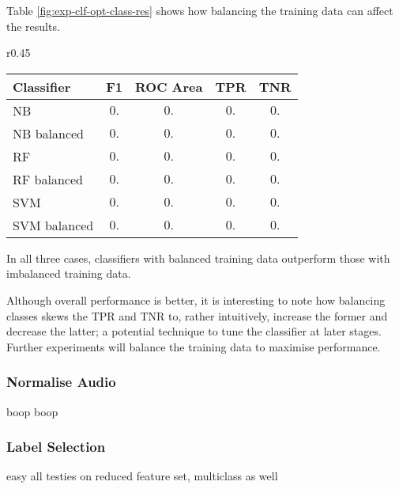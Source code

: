             Table \ref{fig:exp-clf-opt-class-res} shows how balancing the training data can affect the results.
            \begin{wraptable}{r}{0.45\textwidth}
                \scriptsize
                \singlespacing
                \centering
                    \begin{tabular}{ |l|c|c|c|c| } 
                        \hline
                        Classifier & F1 & ROC Area & TPR & TNR \\ 
                        \hline
                        \hline
                        NB          & $0.$ & $0.$  & $0.$ & $0.$\\
                        NB balanced & $0.$ & $0.$ & $0.$ & $0.$\\
                        \hline
                        RF          & $0.$ & $0.$ & $0.$ & $0.$\\
                        RF balanced & $0.$ & $0.$ & $0.$ & $0.$\\
                        \hline
                        SVM          & $0.$ & $0.$ & $0.$ & $0.$\\
                        SVM balanced & $0.$ & $0.$ & $0.$ & $0.$\\
                        \hline
                    
                    \end{tabular}
                \caption{Results of testing balanced training data against non-balanced training data.}
                \label{fig:exp-clf-opt-class-res}
            \end{wraptable}
            In all three cases, classifiers with balanced training data outperform those with imbalanced training data. 
            
            Although overall performance is better, it is interesting to note how balancing classes skews the TPR and TNR to, rather intuitively, increase the former and decrease the latter; a potential technique to tune the classifier at later stages. Further experiments will balance the training data to maximise performance.
        
        \subsubsection{Normalise Audio}
        \label{subsubsec:exp-clf-opt-normaud}
            boop boop
        
        \subsubsection{Label Selection}
        \label{subsubsec:exp-clf-opt-label}
            easy all testies on reduced feature set, multiclass as well
            
